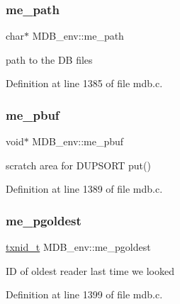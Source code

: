 \mbox{\label{struct_m_d_b__env_a54e99a5b36b889bda5d78f783f724e13}} 
\subsubsection{\texorpdfstring{me\+\_\+path}{me\_path}}
{\footnotesize\ttfamily char$\ast$ M\+D\+B\+\_\+env\+::me\+\_\+path}

path to the DB files 

Definition at line 1385 of file mdb.\+c.

\mbox{\label{struct_m_d_b__env_a1700deb7f48b9a1837007d82dd47da94}} 
\subsubsection{\texorpdfstring{me\+\_\+pbuf}{me\_pbuf}}
{\footnotesize\ttfamily void$\ast$ M\+D\+B\+\_\+env\+::me\+\_\+pbuf}

scratch area for D\+U\+P\+S\+O\+RT put() 

Definition at line 1389 of file mdb.\+c.

\mbox{\label{struct_m_d_b__env_ae2a8e75689dba70d92b5641711b3415a}} 
\subsubsection{\texorpdfstring{me\+\_\+pgoldest}{me\_pgoldest}}
{\footnotesize\ttfamily \mbox{\hyperlink{group__internal_gabbaef7c9c710f8652a62c32d748c040e}{txnid\+\_\+t}} M\+D\+B\+\_\+env\+::me\+\_\+pgoldest}

ID of oldest reader last time we looked 

Definition at line 1399 of file mdb.\+c.

\mbox{\label{struct_m_d_b__env_a0db706a72d88cfe0e32f7ab80a4afa8b}} 
